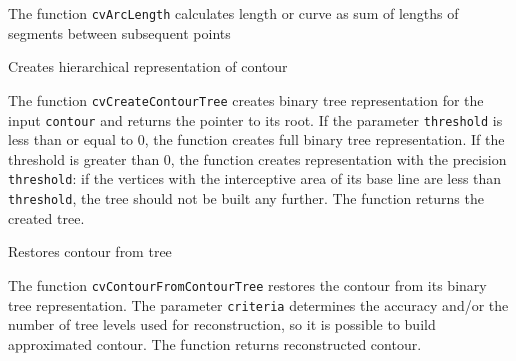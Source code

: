 The function \texttt{cvArcLength} calculates length or curve as sum of lengths of segments between subsequent points

\label{CreateContourTree}

Creates hierarchical representation of contour


\begin{description}
\end{description}

The function \texttt{cvCreateContourTree} creates binary tree representation for the input \texttt{contour} and returns the pointer to its root. If the parameter \texttt{threshold} is less than or equal to 0, the function creates full binary tree representation. If the threshold is greater than 0, the function creates representation with the precision \texttt{threshold}: if the vertices with the interceptive area of its base line are less than \texttt{threshold}, the tree should not be built any further. The function returns the created tree.

\label{ContourFromContourTree}

Restores contour from tree


\begin{description}
\end{description}

The function \texttt{cvContourFromContourTree} restores the contour from its binary tree representation. The parameter \texttt{criteria} determines the accuracy and/or the number of tree levels used for reconstruction, so it is possible to build approximated contour. The function returns reconstructed contour.

\label{MatchContourTrees}

